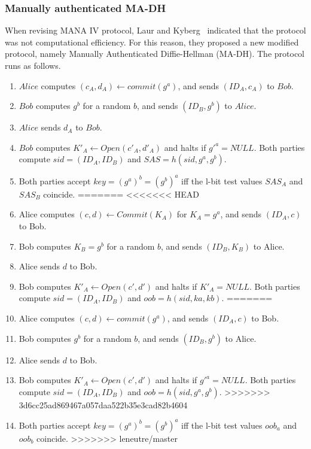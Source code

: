 \begin{enumerate}
\begin{enumerate}
\begin{enumerate}
\subsubsection*{Manually authenticated MA-DH}

When revising MANA IV protocol, Laur and Kyberg~\cite{Laur:2006kl} indicated that the protocol was not computational efficiency. For this reason, they proposed a new modified protocol, namely Manually Authenticated Diffie-Hellman (MA-DH). The protocol runs as follows. 
 
\begin{enumerate}
<<<<<<< HEAD
\item $Alice$ computes $(c_A,d_A) \leftarrow commit(g^a)$, and sends $(ID_A, c_A)$ to $Bob$.
\item $Bob$ computes $g^b$ for a random $b$, and sends $ (ID_B,g^b)$ to $Alice$.
\item $Alice$ sends $d_A$ to $Bob$. 
\item $Bob$ computes $K'_A \leftarrow Open(c'_A,d'_A)$ and halts if $g'^a = NULL$. Both parties compute $sid = (ID_A,ID_B)$ and $SAS= h(sid,g^a,g^b)$.
\item Both parties accept $key = (g^a)^b = (g^b)^a$ iff the l-bit test values $SAS_A$ and $SAS_B$ coincide. 
=======
<<<<<<< HEAD
\item Alice computes $(c,d) \leftarrow Commit(K_A)$ for $K_A = g^a$, and sends $(ID_A, c)$ to Bob.
\item Bob computes $K_B = g^b$ for a random $b$, and sends $ (ID_B,K_B)$ to Alice.
\item Alice sends $d$ to Bob. 
\item Bob computes $K'_A \leftarrow Open(c',d')$ and halts if $K'_A = NULL$. Both parties compute $sid = (ID_A,ID_B)$ and $oob= h(sid,ka,kb)$.
=======
\item Alice computes $(c,d) \leftarrow commit(g^a)$, and sends $(ID_A, c)$ to Bob.
\item Bob computes $g^b$ for a random $b$, and sends $ (ID_B,g^b)$ to Alice.
\item Alice sends $d$ to Bob. 
\item Bob computes $K'_A \leftarrow Open(c',d')$ and halts if $g'^a = NULL$. Both parties compute $sid = (ID_A,ID_B)$ and $oob= h(sid,g^a,g^b)$.
>>>>>>> 3d6cc25ad869467a057daa522b35e3cad82b4604
\item Both parties accept $key = (g^a)^b = (g^b)^a$ iff the l-bit test values $oob_a$ and $oob_b$ coincide. 
>>>>>>> leneutre/master
\end{enumerate}


\end{enumerate}
\end{enumerate}
\end{enumerate}
